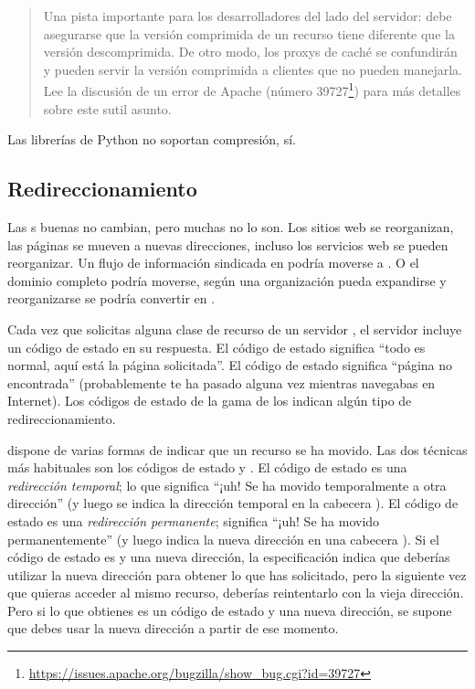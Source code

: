 \begin{quote}
Una pista importante para los desarrolladores del lado del servidor: debe asegurarse que la versión comprimida de un recurso tiene diferente  que la versión descomprimida. De otro modo, los proxys de caché se confundirán y pueden servir la versión comprimida a clientes que no pueden manejarla. Lee la discusión de un error de Apache (número 39727\footnote{\href{https://issues.apache.org/bugzilla/show\_bug.cgi?id=39727}{https://issues.apache.org/bugzilla/show\_bug.cgi?id=39727}}) para más detalles sobre este sutil asunto.
\end{quote}

Las librerías  de Python no soportan compresión,  sí.

\subsection{Redireccionamiento}


Las s buenas no cambian, pero muchas no lo son. Los sitios web se reorganizan, las páginas se mueven a nuevas direcciones, incluso los servicios web se pueden reorganizar. Un flujo de información sindicada en  podría moverse a . O el dominio completo podría moverse, según una organización pueda expandirse y reorganizarse  se podría convertir en .

Cada vez que solicitas alguna clase de recurso de un servidor , el servidor incluye un código de estado en su respuesta. El código de estado  significa ``todo es normal, aquí está la página solicitada''. El código de estado  significa ``página no encontrada'' (probablemente te ha pasado alguna vez mientras navegabas en Internet). Los códigos de estado de la gama de los  indican algún tipo de redireccionamiento.


 dispone de varias formas de indicar que un recurso se ha movido. Las dos técnicas más habituales son los códigos de estado  y . El código de estado  es una \emph{redirección temporal}; lo que significa ``¡uh! Se ha movido temporalmente a otra dirección'' (y luego se indica la dirección temporal en la cabecera ). El código de estado  es una \emph{redirección permanente}; significa ``¡uh! Se ha movido permanentemente'' (y luego indica la nueva dirección en una cabecera ). Si el código de estado es  y una nueva dirección, la especificación  indica que deberías utilizar la nueva dirección para obtener lo que has solicitado, pero la siguiente vez que quieras acceder al mismo recurso, deberías reintentarlo con la vieja dirección. Pero si lo que obtienes es un código de estado  y una nueva dirección, se supone que debes usar la nueva dirección a partir de ese momento.

